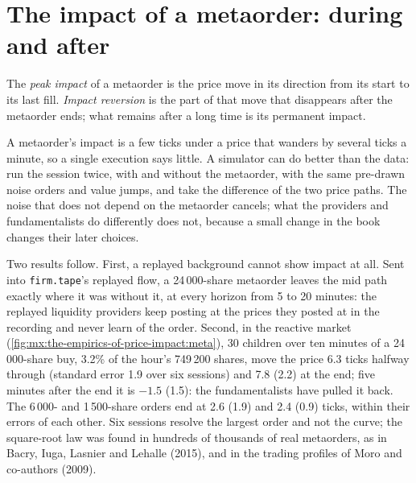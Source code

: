 \section{The impact of a metaorder: during and after}

\begin{definition}\label{def:mx:the-empirics-of-price-impact:peak}
The \emph{peak impact} of a metaorder is the price move in its direction from its start to its last fill. \emph{Impact
reversion} is the part of that move that disappears after the metaorder ends; what remains after a long time is its permanent
impact.
\end{definition}

A metaorder's impact is a few ticks under a price that wanders by several ticks a minute, so a single execution says little. A simulator can do better
than the data: run the session twice, with and without the metaorder, with the same pre-drawn noise orders and value jumps, and take the difference of
the two price paths. The noise that does not depend on the metaorder cancels; what the providers and fundamentalists do differently does not, because a
small change in the book changes their later choices.

Two results follow. First, a replayed background cannot show impact at all. Sent into \texttt{firm.tape}'s replayed flow, a 24\,000-share metaorder
leaves the mid path exactly where it was without it, at every horizon from 5 to 20 minutes: the replayed liquidity providers keep posting at the prices
they posted at in the recording and never learn of the order. Second, in the reactive market (\cref{fig:mx:the-empirics-of-price-impact:meta}), 30 children
over ten minutes of a 24\,000-share buy, 3.2\% of the hour's 749\,200 shares, move the price 6.3 ticks halfway through (standard error 1.9 over six sessions)
and 7.8 (2.2) at the end; five minutes after the end it is $-1.5$ (1.5): the fundamentalists have pulled it back. The 6\,000- and 1\,500-share orders end at
2.6 (1.9) and 2.4 (0.9) ticks, within their errors of each other. Six sessions resolve the largest order and not the curve; the square-root law was
found in hundreds of thousands of real metaorders, as in Bacry, Iuga, Lasnier and Lehalle (2015), and in the trading profiles of Moro and co-authors (2009).

